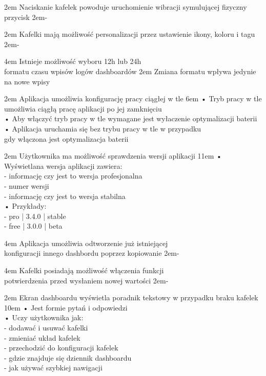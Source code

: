 {2em}{
    Naciskanie kafelek powoduje uruchomienie wibracji symulującej fizyczny przycisk
}
{2em}{-}

{2em}{
    Kafelki mają możliwość personalizacji przez ustawienie ikony, koloru i tagu
}
{2em}{-}

{4em}{
    Istnieje możliwość wyboru 12h lub 24h\\
    formatu czasu wpisów logów dashboardów
}
{2em}{
    Zmiana formatu wpływa jedynie na nowe wpisy
}

{2em}{
    Aplikacja umożliwia konfigurację pracy ciągłej w tle
}
{6em}{
    • Tryb pracy w tle umożliwia ciągłą pracę aplikacji po jej zamknięciu\\
    • Aby włączyć tryb pracy w tle wymagane jest wyłaczenie optymalizacji baterii\\
    • Aplikacja uruchamia się bez trybu pracy w tle w przypadku\\
    \hspace*{0.5em} gdy włączona jest optymalizacja baterii
}

{2em}{
    Użytkownika ma możliwość sprawdzenia wersji aplikacji
}
{11em}{
    • Wyświetlana wersja aplikacji zawiera:\\
    - informację czy jest to wersja profesjonalna\\
    - numer wersji\\
    - informację czy jest to wersja stabilna\\

    • Przykłady:\\
    - pro | 3.4.0 | stable\\
    - free | 3.0.0 | beta
}

{4em}{
    Aplikacja umożliwia odtworzenie już istniejącej\\
    konfiguracji innego dashbordu poprzez kopiowanie
}
{2em}{-}

{4em}{
    Kafelki posiadają możliwość włączenia funkcji\\
    potwierdzenia przed wysłaniem nowej wartości
}
{2em}{-}

{2em}{
    Ekran dashboardu wyświetla poradnik tekstowy w przypadku braku kafelek
}
{10em}{
    • Jest formie pytań i odpowiedzi\\
    • Uczy użytkownika jak:\\
    - dodawać i usuwać kafelki\\
    - zmieniać układ kafelek\\
    - przechodzić do konfiguracji kafelek\\
    - gdzie znajduje się dziennik dashboardu\\
    - jak używać szybkiej nawigacji
}

